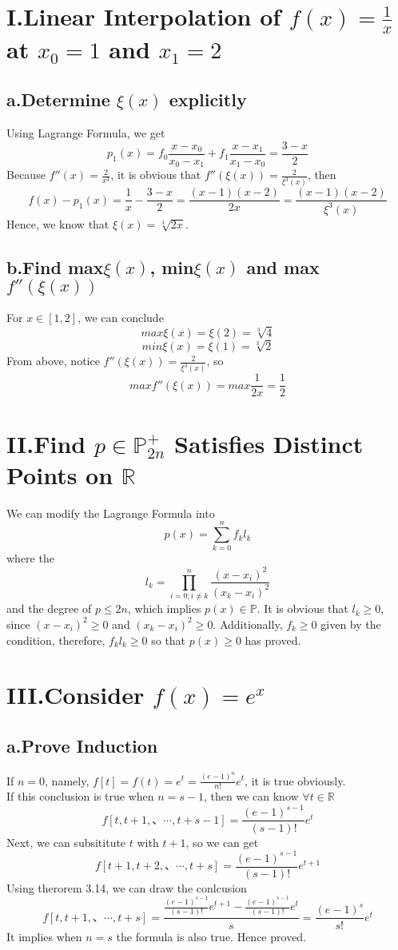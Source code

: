 \documentclass[twoside,a4paper,12pt]{article}
\begin{document}
\pagestyle{fancy}
\fancyhead{}

\section*{I.Linear Interpolation of $f(x)=\frac{1}{x}$ at $x_0=1$ and $x_1=2$}
\subsection*{a.Determine $\xi(x)$ explicitly} 
Using Lagrange Formula, we get
\[
p_{1}(x)=f_0\frac{x-x_0}{x_0-x_1}+f_1\frac{x-x_1}{x_1-x_0}=\frac{3-x}{2}
\]
Because $f''(x)=\frac{2}{x^3}$, it is obvious that $f''(\xi(x))=\frac{2}{\xi^3(x)}$, then 
\[
f(x)-p_1(x)=\frac{1}{x}-\frac{3-x}{2}=\frac{(x-1)(x-2)}{2x}=\frac{(x-1)(x-2)}{\xi^3(x)}
\]
Hence, we know that $\xi(x)=\sqrt[3]{2x}$.
\subsection*{b.Find max$\xi(x)$, min$\xi(x)$ and max$f''(\xi(x))$} 
For $x\in[1,2]$, we can conclude
\[
max\xi(x)=\xi(2)=\sqrt[3]{4}
\]
\[
min\xi(x)=\xi(1)=\sqrt[3]{2}
\]
From above, notice $f''(\xi(x))=\frac{2}{\xi^3(x)}$, so
\[
maxf''(\xi(x))=max\frac{1}{2x}=\frac{1}{2}
\]

\section*{II.Find $p\in\mathbb{P}_{2n}^{+}$ Satisfies Distinct Points on $\mathbb{R}$}
We can modify the Lagrange Formula into
\[
p(x)=\sum_{k=0}^{n}f_{k}l_{k}
\]
where the 
\[
l_k=\prod_{i=0;i \neq k}^{n}\frac{(x-x_i)^2}{(x_k-x_i)^2}
\]
and the degree of $p \leq {2n}$, which implies $p(x) \in \mathbb{P}$. It is obvious that $l_k \geq 0$, since $(x-x_i)^2\geq 0$ and $(x_k-x_i)^2 \geq 0$. Additionally, $f_k \geq 0$ given by the condition, therefore, $f_kl_k\geq 0$ so that $p(x) \geq 0$ has proved. 

\section*{III.Consider $f(x)=e^{x}$}
\subsection*{a.Prove Induction}
If $n=0$, namely, $f[t]=f(t)=e^t=\frac{(e-1)^n}{n!}e^t$, it is true obviously.\\
If this conclusion is true when $n=s-1$, then we can know $\forall t\in \mathbb{R}$
\[
f[t,t+1,、\cdots,t+s-1]=\frac{(e-1)^{s-1}}{(s-1)!}e^{t}
\]
Next, we can subsititute $t$ with $t+1$, so we can get
\[
f[t+1,t+2,、\cdots,t+s]=\frac{(e-1)^{s-1}}{(s-1)!}e^{t+1}
\]
Using therorem 3.14, we can draw the conlcusion
\[
f[t,t+1,、\cdots,t+s]=\frac{\frac{(e-1)^{s-1}}{(s-1)!}e^{t+1}-\frac{(e-1)^{s-1}}{(s-1)!}e^{t}}{s}=\frac{(e-1)^s}{s!}e^t
\]
It implies when $n=s$ the formula is also true. Hence proved.
\end{document}
